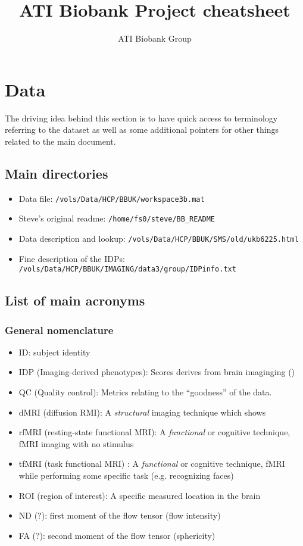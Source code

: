 \documentclass{article}
\begin{document}
\title{ATI Biobank Project cheatsheet}

\author{ATI Biobank Group}

\maketitle

\section{Data\label{sec:data}}
The driving idea behind this section is to have quick access to terminology referring to the dataset as well as some additional pointers for other things related to the main document.

\subsection{Main directories\label{sec:data-dir}}

\begin{itemize}
\item Data file: {\tt /vols/Data/HCP/BBUK/workspace3b.mat}
\item Steve's original readme: {\tt /home/fs0/steve/BB\_README}
\item Data description and lookup: {\tt /vols/Data/HCP/BBUK/SMS/old/ukb6225.html}
\item Fine description of the IDPs: {\tt /vols/Data/HCP/BBUK/IMAGING/data3/group/IDPinfo.txt}
\end{itemize}

\subsection{List of main acronyms\label{sec:data-acro}}

\subsubsection{General nomenclature}
\begin{itemize}
\item ID: subject identity
\item IDP (Imaging-derived phenotypes): Scores derives from brain imaginging ()
\item QC (Quality control): Metrics relating to the ``goodness'' of the data.
\item dMRI (diffusion RMI): A \emph{structural} imaging technique which shows
\item rfMRI (resting-state functional MRI): A \emph{functional} or cognitive technique, fMRI imaging with no stimulus
\item tfMRI (task functional MRI) : A \emph{functional} or cognitive technique, fMRI while performing some specific task (e.g. recognizing faces)
\item ROI (region of interest): A specific measured location in the brain
\item ND (?): first moment of the flow tensor (flow intensity)
\item FA (?): second moment of the flow tensor (sphericity)
\end{itemize}
\end{document}
